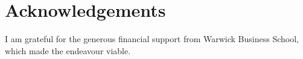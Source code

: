 
\chapter*{Acknowledgements}%
\label{cha:acknowledgements}




I am grateful for the generous financial support from Warwick Business School,
which made the endeavour viable.



